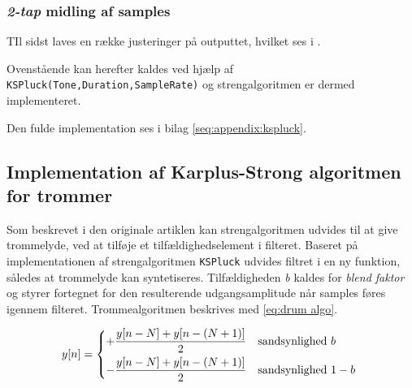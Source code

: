 \subsubsection{\emph{2-tap } midling af samples}


TIl sidst laves en række justeringer på outputtet, hvilket ses i .

Ovenstående kan herefter kaldes ved hjælp af \texttt{KSPluck(Tone,Duration,SampleRate)} og strengalgoritmen er dermed implementeret.

Den fulde implementation ses i bilag \ref{seq:appendix:kspluck}.


\subsection{Implementation af Karplus-Strong algoritmen for trommer}

Som beskrevet i den originale artiklen\cite{Karplus1983} kan strengalgoritmen udvides til at give trommelyde, ved at tilføje et tilfældighedselement i filteret.
Baseret på implementationen af strengalgoritmen \texttt{KSPluck} udvides filtret i en ny funktion, således at trommelyde kan syntetiseres.
Tilfældigheden \textit{b} kaldes for \textit{blend faktor} og styrer fortegnet for den resulterende udgangsamplitude når samples føres igennem filteret.
Trommealgoritmen beskrives med \eqref{eq:drum algo}.

\begin{equation}\label{eq:drum algo}
  y[n] =
  \begin{dcases*}
    +\frac{y[n-N] + y[n - (N+1)]}{2} & sandsynlighed \(b\)   \\
    -\frac{y[n-N] + y[n - (N+1)]}{2} & sandsynlighed \(1-b\)
  \end{dcases*}
\end{equation}

